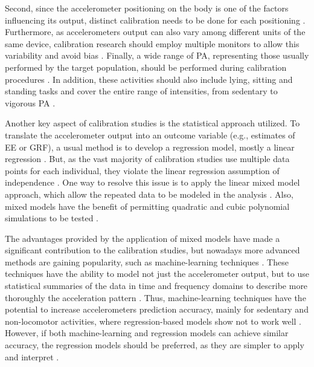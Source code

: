 \documentclass[12pt]{article}
\begin{document}
Second, since the accelerometer positioning on the body is one of the factors influencing its output, distinct calibration needs to be done for each positioning . Furthermore, as accelerometers output can also vary among different units of the same device, calibration research should employ multiple monitors to allow this variability and avoid bias . Finally, a wide range of PA, representing those usually performed by the target population, should be performed during calibration procedures . In addition, these activities should also include lying, sitting and standing tasks and cover the entire range of intensities, from sedentary to vigorous PA .

Another key aspect of calibration studies is the statistical approach utilized. To translate the accelerometer output into an outcome variable (e.g., estimates of EE or GRF), a usual method is to develop a regression model, mostly a linear regression . But, as the vast majority of calibration studies use multiple data points for each individual, they violate the linear regression assumption of independence . One way to resolve this issue is to apply the linear mixed model approach, which allow the repeated data to be modeled in the analysis . Also, mixed models have the benefit of permitting quadratic and cubic polynomial simulations to be tested .

The advantages provided by the application of mixed models have made a significant contribution to the calibration studies, but nowadays more advanced methods are gaining popularity, such as machine-learning techniques . These techniques have the ability to model not just the accelerometer output, but to use statistical summaries of the data in time and frequency domains to describe more thoroughly the acceleration pattern . Thus, machine-learning techniques have the potential to increase accelerometers prediction accuracy, mainly for sedentary and non-locomotor activities, where regression-based models show not to work well . However, if both machine-learning and regression models can achieve similar accuracy, the regression models should be preferred, as they are simpler to apply and interpret .
\end{document}
